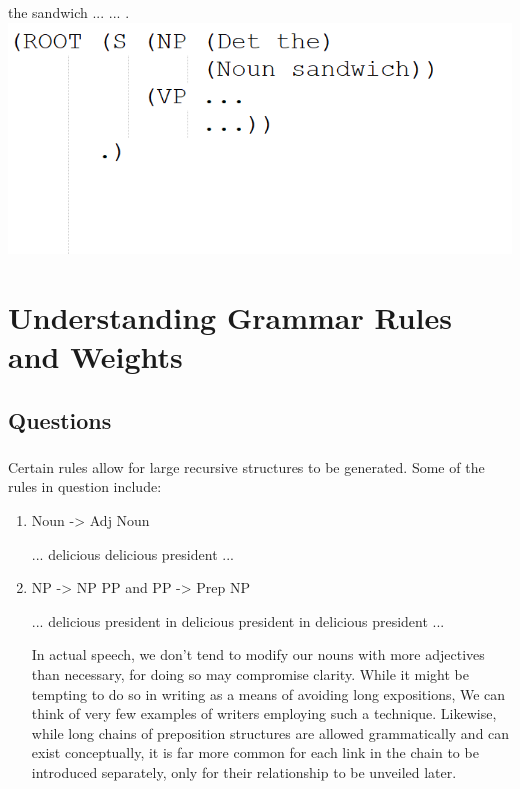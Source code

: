 \documentclass[11pt]{article}
\begin{document}
\subsubsection{}

\noindent the sandwich ... ... .
\medskip
\includegraphics{tree4.png}

\section{Understanding Grammar Rules and Weights}

\subsection{Questions}

\subsubsection{}

\noindent Certain rules allow for large recursive structures to be generated. Some of the rules in question include:

\begin{enumerate}[label=(\arabic*)]
      \item Noun -> Adj Noun

            ... delicious delicious president ...
      \item NP -> NP PP and PP -> Prep NP

            ... delicious president in delicious president in delicious president ...

            \noindent In actual speech, we don't tend to modify our nouns with more adjectives than necessary, for doing so may compromise clarity. While it might be tempting to do so in writing as a means of avoiding long expositions, We can think of very few examples of writers employing such a technique. Likewise, while long chains of preposition structures are allowed grammatically and can exist conceptually, it is far more common for each link in the chain to be introduced separately, only for their relationship to be unveiled later.
\end{enumerate}
\end{document}

